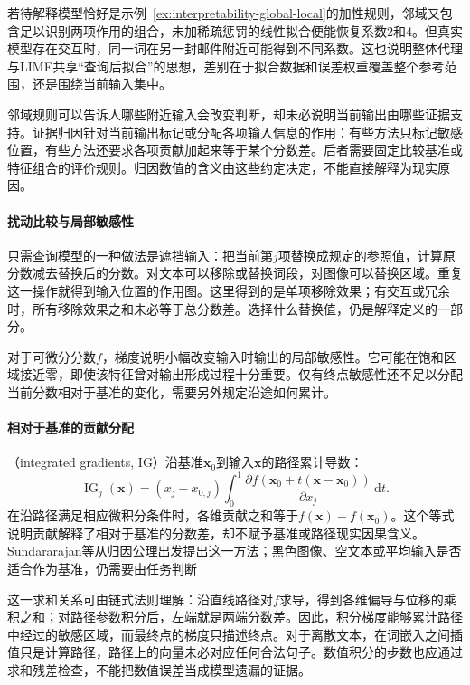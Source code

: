 若待解释模型恰好是示例~\ref{ex:interpretability-global-local}的加性规则，邻域又包含足以识别两项作用的组合，未加稀疏惩罚的线性拟合便能恢复系数2和4。但真实模型存在交互时，同一词在另一封邮件附近可能得到不同系数。这也说明整体代理与LIME共享“查询后拟合”的思想，差别在于拟合数据和误差权重覆盖整个参考范围，还是围绕当前输入集中。

邻域规则可以告诉人哪些附近输入会改变判断，却未必说明当前输出由哪些证据支持。证据归因针对当前输出标记或分配各项输入信息的作用：有些方法只标记敏感位置，有些方法还要求各项贡献加起来等于某个分数差。后者需要固定比较基准或特征组合的评价规则。归因数值的含义由这些约定决定，不能直接解释为现实原因。

\paragraph{扰动比较与局部敏感性}

只需查询模型的一种做法是遮挡输入：把当前第$j$项替换成规定的参照值，计算原分数减去替换后的分数。对文本可以移除或替换词段，对图像可以替换区域。重复这一操作就得到输入位置的作用图。这里得到的是单项移除效果；有交互或冗余时，所有移除效果之和未必等于总分数差。选择什么替换值，仍是解释定义的一部分。

对于可微分分数$f$，梯度说明小幅改变输入时输出的局部敏感性。它可能在饱和区域接近零，即使该特征曾对输出形成过程十分重要。仅有终点敏感性还不足以分配当前分数相对于基准的变化，需要另外规定沿途如何累计。

\paragraph{相对于基准的贡献分配}

（integrated gradients, IG）沿基准$\bm{x}_0$到输入$\bm{x}$的路径累计导数：
\begin{equation}
 \operatorname{IG}_j(\bm{x})
 =(x_j-x_{0,j})\int_0^1
 \frac{\partial f(\bm{x}_0+t(\bm{x}-\bm{x}_0))}
      {\partial x_j}\,\mathrm dt.
 \label{eq:interpretability-ig}
\end{equation}
在沿路径满足相应微积分条件时，各维贡献之和等于$f(\bm{x})-f(\bm{x}_0)$。这个等式说明贡献解释了相对于基准的分数差，却不赋予基准或路径现实因果含义。Sundararajan等从归因公理出发提出这一方法；黑色图像、空文本或平均输入是否适合作为基准，仍需要由任务判断

这一求和关系可由链式法则理解：沿直线路径对$f$求导，得到各维偏导与位移的乘积之和；对路径参数积分后，左端就是两端分数差。因此，积分梯度能够累计路径中经过的敏感区域，而最终点的梯度只描述终点。对于离散文本，在词嵌入之间插值只是计算路径，路径上的向量未必对应任何合法句子。数值积分的步数也应通过求和残差检查，不能把数值误差当成模型遗漏的证据。

